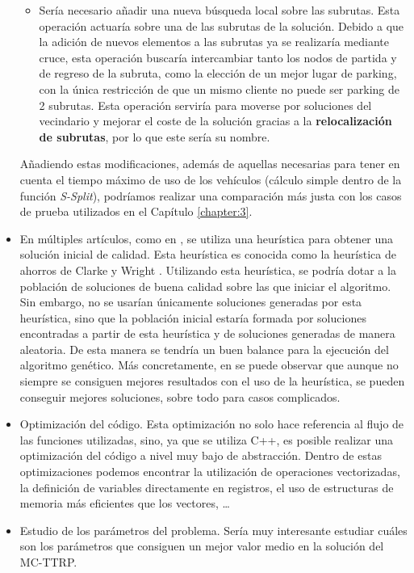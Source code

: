 \begin{itemize}
\begin{itemize}
        \item Sería necesario añadir una nueva búsqueda local sobre las subrutas. Esta operación actuaría sobre una de las subrutas de la solución. Debido a que la adición de nuevos elementos a las subrutas ya se realizaría mediante cruce, esta operación buscaría intercambiar tanto los nodos de partida y de regreso de la subruta, como la elección de un mejor lugar de parking, con la única restricción de que un mismo cliente no puede ser parking de 2 subrutas. Esta operación serviría para moverse por soluciones del vecindario y mejorar el coste de la solución gracias a la \textbf{relocalización de subrutas}, por lo que este sería su nombre.
    \end{itemize}
    Añadiendo estas modificaciones, además de aquellas necesarias para tener en cuenta el tiempo máximo de uso de los vehículos (cálculo simple dentro de la función \textit{S-Split}), podríamos realizar una comparación más justa con los casos de prueba utilizados en el Capítulo \ref{chapter:3}.
    \item En múltiples artículos, como en \cite{MC-VRP-Memetic-ElFallahi,laura-mcttrp}, se utiliza una heurística para obtener una solución inicial de calidad. Esta heurística es conocida como la heurística de ahorros de Clarke y Wright \cite{clarke-1964}. Utilizando esta heurística, se podría dotar a la población de soluciones de buena calidad sobre las que iniciar el algoritmo. Sin embargo, no se usarían únicamente soluciones generadas por esta heurística, sino que la población inicial estaría formada por soluciones encontradas a partir de esta heurística y de soluciones generadas de manera aleatoria. De esta manera se tendría un buen balance para la ejecución del algoritmo genético. Más concretamente, en \cite{MC-VRP-Memetic-ElFallahi} se puede observar que aunque no siempre se consiguen mejores resultados con el uso de la heurística, se pueden conseguir mejores soluciones, sobre todo para casos complicados.
    \item Optimización del código. Esta optimización no solo hace referencia al flujo de las funciones utilizadas, sino, ya que se utiliza C++, es posible realizar una optimización del código a nivel muy bajo de abstracción. Dentro de estas optimizaciones podemos encontrar la utilización de operaciones vectorizadas, la definición de variables directamente en registros, el uso de estructuras de memoria más eficientes que los vectores, \ldots
    \item Estudio de los parámetros del problema. Sería muy interesante estudiar cuáles son los parámetros que consiguen un mejor valor medio en la solución del MC-TTRP.

\end{itemize}
